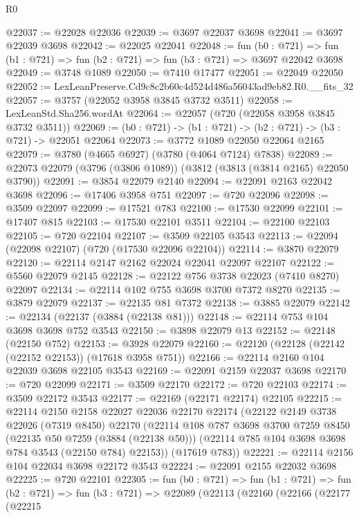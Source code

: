 \begin{lexlean}{R0}
\begin{coremodule}
@22037 := @22028 @22036
@22039 := @3697 @22037 @3698
@22041 := @3697 @22039 @3698
@22042 := @22025 @22041
@22048 := fun (b0 : @721) =>
  fun (b1 : @721) => fun (b2 : @721) => fun (b3 : @721) => @3697 @22042 @3698
@22049 := @3748 @1089
@22050 := @7410 @17477
@22051 := @22049 @22050
@22052 := LexLeanPreserve.Cd9c8c2b60c4d524d486a56043ad9eb82.R0.__fits_32
@22057 := @3757 (@22052 @3958 @3845 @3732 @3511)
@22058 := LexLeanStd.Sha256.wordAt
@22064 := @22057 (@720 (@22058 @3958 @3845 @3732 @3511))
@22069 := (b0 : @721) -> (b1 : @721) -> (b2 : @721) -> (b3 : @721) -> @22051 @22064
@22073 := @3772 @1089 @22050 @22064 @2165
@22079 := @3780 (@4665 @6927) (@3780 (@4064 @7124) @7838)
@22089 := @22073 @22079 (@3796 (@3806 @1089)) (@3812 (@3813 (@3814 @2165) @22050 @3790))
@22091 := @3854 @22079 @2140
@22094 := @22091 @2163 @22042 @3698
@22096 := @17406 @3958 @751
@22097 := @720 @22096
@22098 := @3509 @22097
@22099 := @17521 @783
@22100 := @17530 @22099
@22101 := @17407 @815
@22103 := @17530 @22101 @3511
@22104 := @22100 @22103
@22105 := @720 @22104
@22107 := @3509 @22105 @3543
@22113 := @22094 (@22098 @22107) (@720 (@17530 @22096 @22104))
@22114 := @3870 @22079
@22120 := @22114 @2147 @2162 @22024 @22041 @22097 @22107
@22122 := @5560 @22079 @2145
@22128 := @22122 @756 @3738 @22023 (@7410 @8270) @22097
@22134 := @22114 @102 @755 @3698 @3700 @7372 @8270
@22135 := @3879 @22079
@22137 := @22135 @81 @7372
@22138 := @3885 @22079
@22142 := @22134 (@22137 (@3884 (@22138 @81)))
@22148 := @22114 @753 @104 @3698 @3698 @752 @3543
@22150 := @3898 @22079 @13
@22152 := @22148 (@22150 @752)
@22153 := @3928 @22079
@22160 := @22120 (@22128 (@22142 (@22152 @22153)) (@17618 @3958 @751))
@22166 := @22114 @2160 @104 @22039 @3698 @22105 @3543
@22169 := @22091 @2159 @22037 @3698
@22170 := @720 @22099
@22171 := @3509 @22170
@22172 := @720 @22103
@22174 := @3509 @22172 @3543
@22177 := @22169 (@22171 @22174) @22105
@22215 := @22114
    @2150
    @2158
    @22027
    @22036
    @22170
    @22174
    (@22122
      @2149
      @3738
      @22026
      (@7319 @8450)
      @22170
      (@22114
        @108
        @787
        @3698
        @3700
        @7259
        @8450
        (@22135 @50 @7259 (@3884 (@22138 @50)))
        (@22114 @785 @104 @3698 @3698 @784 @3543 (@22150 @784) @22153))
      (@17619 @783))
@22221 := @22114 @2156 @104 @22034 @3698 @22172 @3543
@22224 := @22091 @2155 @22032 @3698
@22225 := @720 @22101
@22305 := fun (b0 : @721) =>
  fun (b1 : @721) =>
  fun (b2 : @721) =>
  fun (b3 : @721) =>
  @22089
    (@22113
      (@22160
        (@22166
          (@22177
            (@22215

\end{coremodule}
\end{lexlean}

